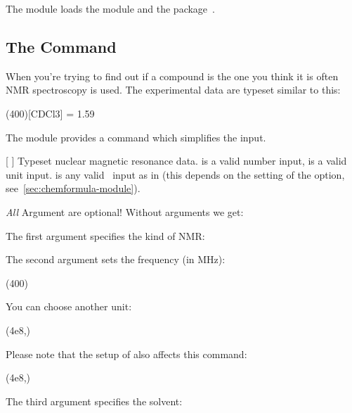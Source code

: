 \documentclass{chemmacros-manual}
\begin{document}
The  module loads the  module
and the  package~\cite{pkg:siunitx}.

\subsection{The  Command}

When you're trying to find out if a compound is the one you think it is often
NMR spectroscopy is used.  The experimental data are typeset similar to this:
\begin{center}
  \NMR(400)[CDCl3] = \num{1.59}
\end{center}
The  module provides a command which simplifies the
input.

\begin{commands}
  [\sarg{}%
    ]
    Typeset nuclear magnetic resonance data.  is a valid
     number input,  is a valid  unit
    input.   is any valid \chemformula\ input as in 
    (this depends on the setting of the  option,
    see~\vref{sec:chemformula-module}).
\end{commands}

\emph{All} Argument are optional! Without arguments we get:
\begin{example}
  \NMR \par
  \NMR*
\end{example}

The first argument specifies the kind of NMR:
\begin{example}
\end{example}

The second argument sets the frequency (in \unit{\mega\hertz}):
\begin{example}
  \NMR(400)
\end{example}
You can choose another unit:
\begin{example}
  \NMR(4e8,\hertz)
\end{example}
Please note that the setup of  also affects this command:
\begin{example}
  \NMR(4e8,\hertz)
\end{example}

The third argument specifies the solvent:
\begin{example}
  \NMR[CDCl3]
\end{example}
\end{document}
